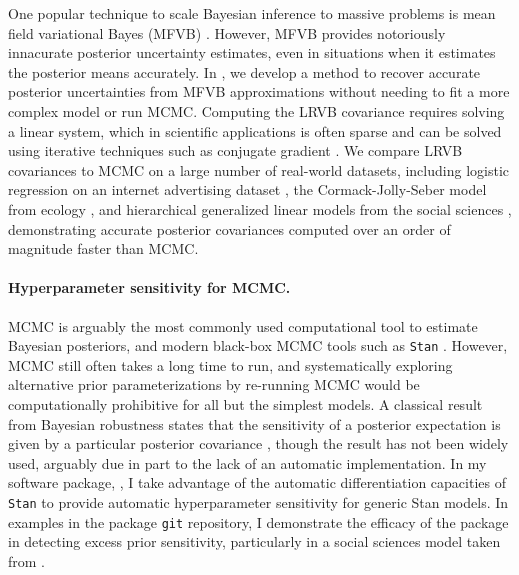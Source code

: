 One popular technique to scale Bayesian inference to massive problems is mean
field variational Bayes (MFVB) \citep{wainwright:2008:graphical,
blei:2017:variational, regier:2019:cataloging}.  However, MFVB provides
notoriously innacurate posterior uncertainty estimates, even in situations when
it estimates the posterior means accurately. In
\citep{giordano:2018:covariances}, we develop a method to recover accurate
posterior uncertainties from MFVB approximations without needing to fit a more
complex model or run MCMC. Computing the LRVB covariance requires solving a
linear system, which in scientific applications is often sparse and can be
solved using iterative techniques such as conjugate gradient \citep[Chapter
5]{nocedal:2006:numerical}.  We compare LRVB covariances to MCMC on a large
number of real-world datasets, including logistic regression on an internet
advertising dataset \citep{criteo:2014:dataset}, the Cormack-Jolly-Seber model
from ecology \citep{kery:2011:bayesian}, and hierarchical generalized linear
models from the social sciences \citep{gelman:2006:arm}, demonstrating accurate
posterior covariances computed over an order of magnitude faster than MCMC.


\paragraph{Hyperparameter sensitivity for MCMC.}

MCMC is arguably the most commonly used computational tool to estimate Bayesian
posteriors, and modern black-box MCMC tools such as \texttt{Stan} \citep{rstan,
carpenter:2017:stan}.  However, MCMC still often takes a long time to run, and
systematically exploring alternative prior parameterizations by re-running MCMC
would be computationally prohibitive for all but the simplest models. A
classical result from Bayesian robustness states that the sensitivity of a
posterior expectation is given by a particular posterior covariance
\citep{gustafson:1996:localposterior, basu:1996:local}, though the result has
not been widely used, arguably due in part to the lack of an automatic
implementation. In my software package, \citet{giordano:2020:rstansensitivity},
I take advantage of the automatic differentiation capacities of
\texttt{Stan} to provide automatic hyperparameter sensitivity for
generic Stan models.  In examples in the package \texttt{git} repository,
I demonstrate the efficacy of the package in detecting excess prior
sensitivity, particularly in a social sciences model taken from
\citet[Chapter 13.5]{gelman:2006:arm}.


